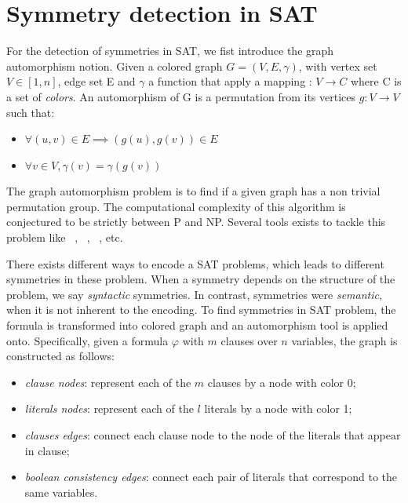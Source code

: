 \section{Symmetry detection in SAT}

For the detection of symmetries in SAT, we fist introduce the graph automorphism notion.
Given a colored graph $G = (V, E, \gamma)$, with vertex set $V \in  [1, n] $, edge set E and
$\gamma$ a function that apply a mapping : $V \rightarrow C$ where C is a set of \emph{colors}.
An automorphism of G is a permutation from its vertices $g :V \rightarrow V$ 
such that:
\begin{itemize}
	\item $\forall (u, v) \in E \implies (g(u), g(v)) \in E$
	\item $\forall v \in V, \gamma(v) = \gamma(g(v))$
\end{itemize}

The graph automorphism problem is to find if a given graph has a non trivial permutation group. 
The computational complexity of this algorithm is conjectured to be strictly between P and NP.
Several tools exists to tackle this problem like \saucy~\cite{katebi2010symmetry},
\bliss~\cite{JunttilaKaski:ALENEX2007}, \nauty~\cite{mckay2003nauty}, etc.



There exists different ways to encode a SAT problems,
which leads to different symmetries in these problem.
When a symmetry depends on the structure of the problem, we say \emph{syntactic} symmetries. 
In contrast, symmetries were \emph{semantic}, when it is not inherent to the encoding.
To find symmetries in SAT problem, the formula is transformed into colored graph
and an automorphism tool is applied onto. Specifically, given a formula $\varphi$ with
$m$ clauses over $n$ variables, the graph is constructed as follows:
\begin{itemize}
	\item \emph{clause nodes}: represent each of the $m$ clauses by a node with color 0;
	\item \emph{literals nodes}: represent each of the $l$ literals by a node with color 1;
	\item \emph{clauses edges}: connect each clause node to the node of the literals that appear in clause;
	\item \emph{boolean consistency edges}: connect each pair of literals that correspond to the same variables.
\end{itemize}


